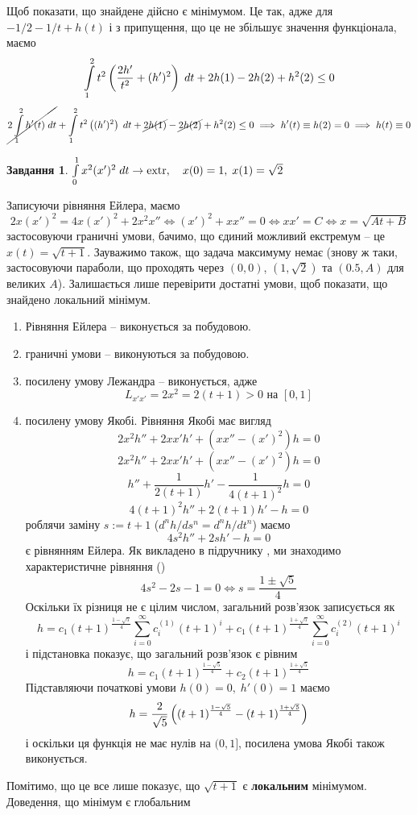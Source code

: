 \documentclass[12pt]{article} %
\newtheorem{prob}{Завдання}
\newcommand{\dt}{\;dt}
\newcommand{\extr}{\mbox{\normalfont extr}}
\begin{document}
Щоб показати, що знайдене дійсно є мінімумом. Це так, адже для $-1/2-1/t+h(t)$ і з припущення, що це не збільшує значення функціонала, маємо
\[\int_1^2t^2\mybra{\frac{2h'}{t^2}+(h')^2}\dt+2h(1)-2h(2)+h^2(2)\leq0\]
\[\cancel{2\int_1^2h'(t)\dt}+\int_1^2t^2\mybra{(h')^2}\dt+\cancel{2h(1)}-\cancel{2h(2)}+h^2(2)\leq0\implies h'(t)\equiv h(2)=0\implies h(t)\equiv0\]
\begin{prob}{}\; $\int_0^1x^2(x')^2\dt\to\extr,\quad x(0)=1,\;x(1)=\sqrt{2}$\end{prob}
	Записуючи рівняння Ейлера, маємо
	\[2x(x')^2=4x(x')^2+2x^2x''\iff (x')^2+xx''=0\iff xx'=C\iff x=\sqrt{At+B}\]
	застосовуючи граничні умови, бачимо, що єдиний можливий екстремум -- це $x(t)=\sqrt{t+1}$. Зауважимо також, що задача
	максимуму немає (знову ж таки, застосовуючи параболи, що проходять через $(0,0)$, $(1,\sqrt{2})$ та $(0.5,A)$ для великих $A$). Залишається
	лише перевірити достатні умови, щоб показати, що знайдено локальний мінімум.
	\begin{enumerate}
		\item Рівняння Ейлера -- виконується за побудовою.
		\item граничні умови -- виконуються за побудовою.
		\item посилену умову Лежандра -- виконується, адже
			\[L_{x'x'}=2x^2=2(t+1)>0\mbox{ на }[0,1]\]
		\item посилену умову Якобі. Рівняння Якобі має вигляд
			\[2x^2h''+2xx'h'+(xx''-(x')^2)h=0\]
			\[2x^2h''+2xx'h'+(xx''-(x')^2)h=0\]
			\[h''+\frac{1}{2(t+1)}h'-\frac{1}{4(t+1)^2}h=0\]
			\[4(t+1)^2h''+2(t+1)h'-h=0\]
			роблячи заміну $s:=t+1$ ($d^nh/ds^n=d^nh/dt^n$) маємо 
			\[4s^2h''+2sh'-h=0\]
			є рівнянням Ейлера. Як викладено в підручнику \cite[с. 290]{samoilenko}, ми знаходимо характеристичне
			рівняння (\cite[(3.28)]{samoilenko})
			\[4s^2-2s-1=0\iff s=\frac{1\pm\sqrt{5}}{4}\]
			Оскільки їх різниця не є цілим числом, загальний розв’язок записується як
			\[h=c_1(t+1)^{\frac{1-\sqrt{5}}{4}}\sum_{i=0}^\infty c^{(1)}_i(t+1)^i+
			c_1(t+1)^{\frac{1+\sqrt{5}}{4}}\sum_{i=0}^\infty c^{(2)}_i(t+1)^i\]
			і підстановка показує, що загальний розв’язок є рівним
			\[h=c_1(t+1)^{\frac{1-\sqrt{5}}{4}}+c_2(t+1)^{\frac{1+\sqrt{5}}{4}}\]
			Підставляючи початкові умови $h(0)=0,\;h'(0)=1$ маємо
			\[h=\frac{2}{\sqrt{5}}\left((t+1)^{\frac{1-\sqrt{5}}{4}}-(t+1)^{\frac{1+\sqrt{5}}{4}}\right)\]
			і оскільки ця функція не має нулів на $(0,1]$, посилена умова Якобі також виконується.
	\end{enumerate}
	Помітимо, що це все лише показує, що $\sqrt{t+1}$ є \textbf{локальним} мінімумом. Доведення, що мінімум є глобальним
\end{document}
